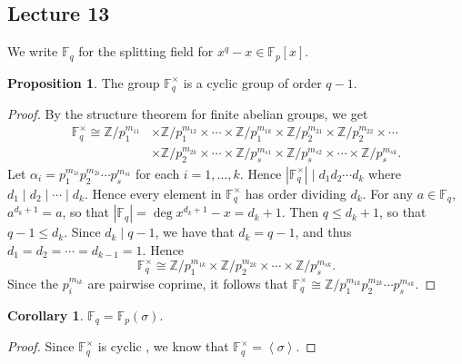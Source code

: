 \documentclass[10pt,letterpaper,cm]{nupset}
\theoremstyle{definition}
\theoremstyle{theorem}
\newtheorem{prop}[definition]{Proposition}
\newtheorem{corollary}[definition]{Corollary}
\theoremstyle{remark}
\newcommand{\F}{\mathbb F}
\newcommand{\Z}{\mathbb Z}
\newcommand{\1}{\mathbf{1}}
\newcommand{\0}{\vec 0}
\begin{document}
\subsection{Lecture 13}


We write $\F_q$ for the splitting field for $x^q -x \in \F_p[x]$.


\begin{prop} 
The group $\F_q^{\times}$ is a cyclic group of order $q-1$.
\end{prop}
\begin{proof}
By the structure theorem for finite abelian groups, we get 
\begin{align*}
\F_q^{\times} \cong  \Z/p_1^{m_{11}}  & \times \Z/p_1^{m_{12}} \times \cdots \times \Z/p_1^{m_{1k}}
 \times \Z/p_2^{m_{21}} \times \Z/p_2^{m_{22}}  \times \cdots
 \\ &  \times \Z/p_2^{m_{2k}} \times \cdots \times \Z/p_s^{m_{s1}} \times \Z/p_s^{m_{s2}} \times \cdots \times \Z/p_s^{m_{sk}} .
\end{align*}
Let $\alpha_i = p_1^{m_{1i}}p_2^{m_{2i}}\cdots p_s^{m_{si}}$ for each $i=1, \ldots, k$. Hence $\left\lvert{\F_q^{\times}}\right\rvert \mid d_1d_2 \cdots d_k$ where $d_1 \mid d_2 \mid \cdots \mid d_k$. Hence every element in $\F_q^{\times}$ has order dividing $d_k$.  For any $a\in \F_q$, $a^{d_k +1} =a$, so that $\left\lvert{\F_q}\right\rvert = \deg{x^{d_k+1} -x} = d_k+1$. Then $q \leq d_k+1$, so that $q-1 \leq d_k$. Since $d_k \mid q-1$, we have that $d_k = q-1$, and thus $d_1 = d_2 = \cdots = d_{k-1} = 1$. Hence $$\F_q^{\times} \cong \Z/p_1^{m_{1k}} \times \Z/p_2^{m_{2k}} \times \cdots \times \Z/p_s^{m_{sk}}.$$ Since the $p_i^{m_{ik}}$ are pairwise coprime, it follows that $\F_q^{\times} \cong  \Z/p_1^{m_{1k}} p_2^{m_{2k}} \cdots p_s^{m_{sk}}$. 
\end{proof}
\begin{corollary}
$\F_q = \F_p(\sigma)$.
\end{corollary}
\begin{proof}
Since $\F_q^{\times}$ is cyclic , we know that $\F_q^{\times} = \left\langle \sigma \right\rangle$.
\end{proof}
\end{document}
